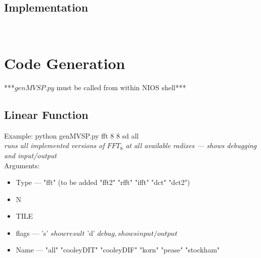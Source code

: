 \documentclass[11pt]{article}
\begin{document}
\subsection*{Implementation}
\begin{center}
\\
\end{center}


\newpage
\section*{Code Generation}
***$genMVSP.py$ must be called from within NIOS shell***
\subsection*{Linear Function}
\noindent\makebox[\linewidth]{\rule{\textwidth}{1pt}} 
\newline Example: python genMVSP.py fft 8 8 sd all\\
\emph{runs all implemented versions of $FFT_8$ at all available radixes --- shows debugging and input/output}\\
\noindent\makebox[\linewidth]{\rule{\textwidth}{1pt}} 
\newline Arguments:
\begin{itemize}
\item Type --- "fft" (to be added "fft2" "rfft" "ifft" "dct" "dct2")
\item N
\item TILE
\item flags --- 's' $show result$ 'd' $debug, shows input/output$
\item Name --- "all" "cooleyDIT" "cooleyDIF" "korn" "pease" "stockham"
\end{itemize}
\end{document}
